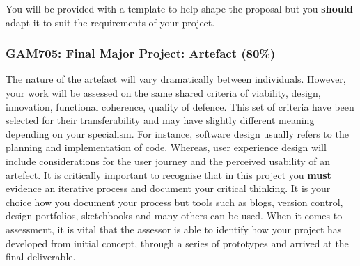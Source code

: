 You will be provided with a template to help shape the proposal but you \textbf{should} adapt it to suit the requirements of your project. 

\subsubsection*{GAM705: Final Major Project: Artefact (80\%)}

The nature of the artefact will vary dramatically between individuals. However, your work will be assessed on the same shared criteria of viability, design, innovation, functional coherence, quality of defence. This set of criteria have been selected for their transferability and may have slightly different meaning depending on your specialism. For instance, software design usually refers to the planning and implementation of code. Whereas, user experience design will include considerations for the user journey and the perceived usability of an artefect. It is critically important to recognise that in this project you \textbf{must} evidence an iterative process and document your critical thinking. It is your choice how you document your process but tools such as blogs, version control, design portfolios, sketchbooks and many others can be used. When it comes to assessment, it is vital that the assessor is able to identify how your project has developed from initial concept, through a series of prototypes and arrived at the final deliverable.
